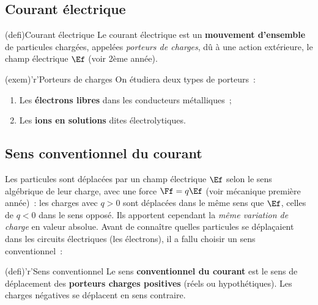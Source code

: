 \documentclass[../../main/main.tex]{subfiles}
\begin{document}
\subsection{Courant électrique}
\begin{tcbraster}[raster columns=2, raster equal height=rows]
	\begin{tcb}[label=def:courant](defi){Courant électrique}
		Le courant électrique est un \textbf{mouvement d'ensemble} de particules
		chargées, appelées \textit{porteurs de charges}, dû à une action
		extérieure, le champ électrique $\Ef$ (voir 2ème année).
	\end{tcb}
	\begin{tcb}[label=exem:porteurs](exem)'r'{Porteurs de charges}
		On étudiera deux types de porteurs~:
		\begin{enumerate}
			\item Les \textbf{électrons libres} dans les conducteurs métalliques~;
			\item Les \textbf{ions en solutions} dites électrolytiques.
		\end{enumerate}
	\end{tcb}
\end{tcbraster}

\subsection{Sens conventionnel du courant}

\begin{tcbraster}[raster columns=3, raster equal height=rows]
	\begin{tcolorbox}[blankest, raster multicolumn=2, valign=center]
		Les particules sont déplacées par un champ électrique $\Ef$ selon le sens
		algébrique de leur charge, avec une force $\Ff = q\Ef$ (voir mécanique
		première année)~: les charges avec $q>0$ sont déplacées dans le même sens
		que $\Ef$, celles de $q<0$ dans le sens opposé. Ils apportent cependant la
		\textit{même variation de charge} en valeur absolue. Avant de connaître
		quelles particules se déplaçaient dans les circuits électriques (les
		électrons), il a fallu choisir un sens conventionnel~:
	\end{tcolorbox}
	\begin{tcb}[label=def:sensconv](defi)'r'{Sens conventionnel}
		Le sens \textbf{conventionnel du courant} est le sens de déplacement des
		\textbf{porteurs charges positives} (réels ou hypothétiques). Les charges
		négatives se déplacent en sens contraire.
	\end{tcb}
\end{tcbraster}
\end{document}
